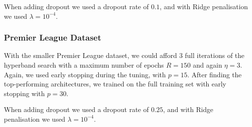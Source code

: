         When adding dropout we used a dropout rate of $0.1$, and with Ridge penalisation we used $\lambda=10^{-4}$.

    \subsubsection{Premier League Dataset}
        With the smaller Premier League dataset, we could afford 3 full iterations of the hyperband search with a maximum number of epochs $R=150$ and again $\eta=3$. Again, we used early stopping during the tuning, with $p=15$. After finding the top-performing architectures, we trained on the full training set with early stopping with $p=30$.

        When adding dropout we used a dropout rate of $0.25$, and with Ridge penalisation we used $\lambda=10^{-4}$.

